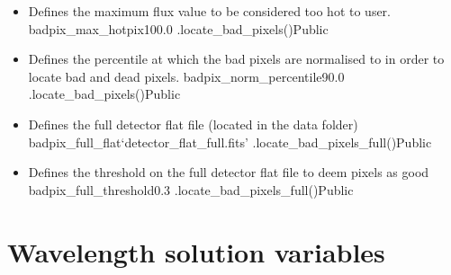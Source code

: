 \begin{itemize}
	\item {}
	{Defines the maximum flux value to be considered too hot to user.}
	{badpix\_max\_hotpix}{100.0}
	{\calbadpix}{\constantsfile}{\spirouImage.locate\_bad\_pixels()}{Public}

	\item {}
	{Defines the percentile at which the bad pixels are normalised to in order to locate bad and dead pixels.}
	{badpix\_norm\_percentile}{90.0}
	{\calbadpix}{\constantsfile}{\spirouImage.locate\_bad\_pixels()}{Public}


	\item {}
	{Defines the full detector flat file (located in the data folder)}
	{badpix\_full\_flat}{`detector\_flat\_full.fits'}
	{\calbadpix}{\constantsfile}{\spirouImage.locate\_bad\_pixels\_full()}{Public}

	\item {}
	{Defines the threshold on the full detector flat file to deem pixels as good}
	{badpix\_full\_threshold}{0.3}
	{\calbadpix}{\constantsfile}{\spirouImage.locate\_bad\_pixels\_full()}{Public}

\end{itemize}


\clearpage
\newpage
\section{Wavelength solution variables}
\label{ch:variables:wave}


